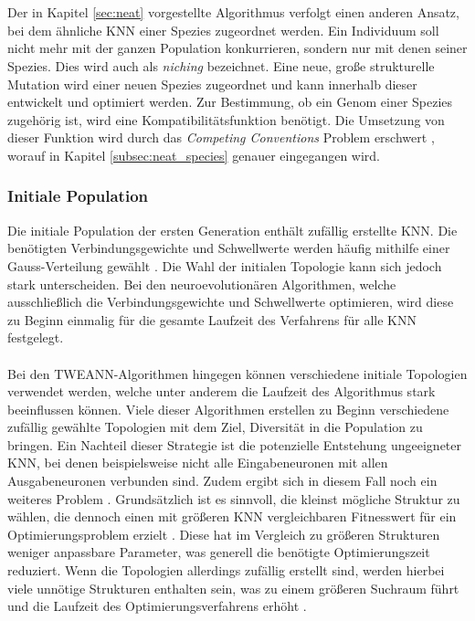 \\\\
Der in Kapitel \ref{sec:neat} vorgestellte Algorithmus verfolgt einen anderen Ansatz, bei dem ähnliche \ac{KNN} einer Spezies zugeordnet werden. Ein Individuum soll nicht mehr mit der ganzen Population konkurrieren, sondern nur mit denen seiner Spezies. Dies wird auch als \emph{niching} bezeichnet. Eine neue, große strukturelle Mutation wird einer neuen Spezies zugeordnet und kann innerhalb dieser entwickelt und optimiert werden. Zur Bestimmung, ob ein Genom einer Spezies zugehörig ist, wird eine Kompatibilitätsfunktion benötigt. Die Umsetzung von dieser Funktion wird durch das \emph{Competing Conventions} Problem erschwert \cite{stanley2002evolving}, worauf in Kapitel \ref{subsec:neat_species} genauer eingegangen wird.
 
\subsubsection{Initiale Population}
Die initiale Population der ersten Generation enthält zufällig erstellte \ac{KNN}. Die benötigten Verbindungsgewichte und Schwellwerte werden häufig mithilfe einer Gauss-Verteilung gewählt \cite{mcintyre_neatpython}. Die Wahl der initialen Topologie kann sich jedoch stark unterscheiden. Bei den neuroevolutionären Algorithmen, welche ausschließlich die Verbindungsgewichte und Schwellwerte optimieren, wird diese zu Beginn einmalig für die gesamte Laufzeit des Verfahrens für alle \ac{KNN} festgelegt.
\\\\
Bei den \ac{TWEANN}-Algorithmen hingegen können verschiedene initiale Topologien verwendet werden, welche unter anderem die Laufzeit des Algorithmus stark beeinflussen können. Viele dieser Algorithmen erstellen zu Beginn verschiedene zufällig gewählte Topologien mit dem Ziel, Diversität in die Population zu bringen. Ein Nachteil dieser Strategie ist die potenzielle Entstehung ungeeigneter \ac{KNN}, bei denen beispielsweise nicht alle Eingabeneuronen mit allen Ausgabeneuronen verbunden sind. Zudem ergibt sich in diesem Fall noch ein weiteres Problem \cite{stanley2002evolving}. Grundsätzlich ist es sinnvoll, die kleinst mögliche Struktur zu wählen, die dennoch einen mit größeren \ac{KNN} vergleichbaren Fitnesswert für ein Optimierungsproblem erzielt \cite{zhang1993evolving}. Diese hat im Vergleich zu größeren Strukturen weniger anpassbare Parameter, was generell die benötigte Optimierungszeit reduziert. Wenn die Topologien allerdings zufällig erstellt sind, werden hierbei viele unnötige Strukturen enthalten sein, was zu einem größeren Suchraum führt und die Laufzeit des Optimierungsverfahrens erhöht \cite{stanley2002evolving}. 

